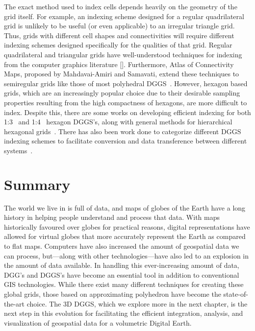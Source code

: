 The exact method used to index cells depends heavily on the geometry of the grid itself.
For example, an indexing scheme designed for a regular quadrilateral grid is unlikely to be useful (or even applicable) to an irregular triangle grid.
Thus, grids with different cell shapes and connectivities will require different indexing schemes designed specifically for the qualities of that grid.
Regular quadrilateral and triangular grids have well-understood techniques for indexing from the computer graphics literature [].
Furthermore, Atlas of Connectivity Maps, proposed by Mahdavai-Amiri and Samavati, extend these techniques to semiregular grids like those of most polyhedral DGGS~\cite{mahdavi2014atlas}.
However, hexagon based grids, which are an increasingly popular choice due to their desirable sampling properties resulting from the high compactness of hexagons, are more difficult to index.
Despite this, there are some works on developing efficient indexing for both 1:3~\cite{vince2006indexing} and 1:4~\cite{tong2013efficient} hexagon DGGS's, along with general methods for hierarchical hexagonal grids~\cite{mahdavi2015hexagonal}.
There has also been work done to categorize different DGGS indexing schemes to facilitate conversion and data transference between different systems~\cite{mahdavi2015categorization}.


\section{Summary}
The world we live in is full of data, and maps of globes of the Earth have a long history in helping people understand and process that data.
With maps historically favoured over globes for practical reasons, digital representations have allowed for virtual globes that more accurately represent the Earth as compared to flat maps.
Computers have also increased the amount of geospatial data we can process, but---along with other technologies---have also led to an explosion in the amount of data available.
In handling this ever-increasing amount of data, DGG's and DGGS's have become an essential tool in addition to conventional GIS technologies.
While there exist many different techniques for creating these global grids, those based on approximating polyhedron have become the state-of-the-art choice.
The 3D DGGS, which we explore more in the next chapter, is the next step in this evolution for facilitating the efficient integration, analysis, and visualization of geospatial data for a volumetric Digital Earth.
